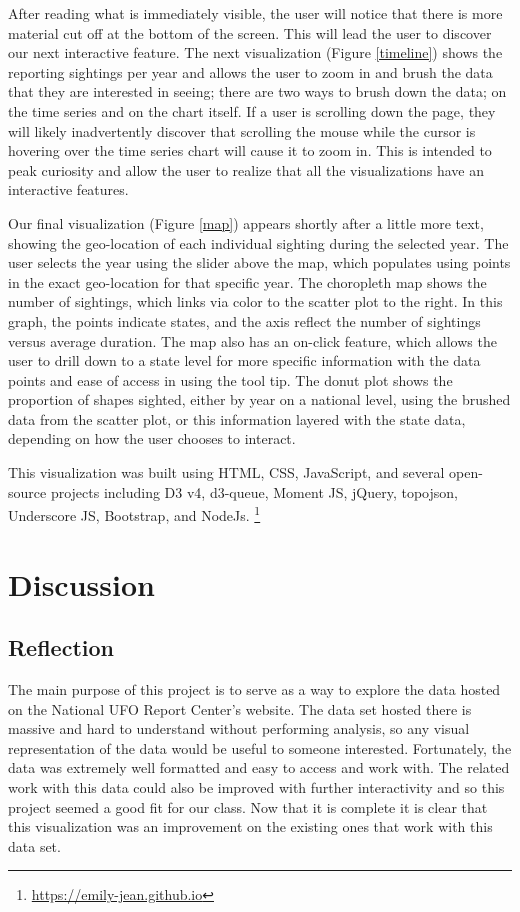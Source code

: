 \documentclass[journal]{vgtc}                %
\begin{document}
After reading what is immediately visible, the user will notice that there is more material cut off at the bottom of the screen. This will lead the user to discover our next interactive feature. The next visualization (Figure \ref{timeline}) shows the reporting sightings per year and allows the user to zoom in and brush the data that they are interested in seeing; there are two ways to brush down the data; on the time series and on the chart itself. If a user is scrolling down the page, they will likely inadvertently discover that scrolling the mouse while the cursor is hovering over the time series chart will cause it to zoom in. This is intended to peak curiosity and allow the user to realize that all the visualizations have an interactive features.

Our final visualization (Figure \ref{map}) appears shortly after a little more text, showing the geo-location of each individual sighting during the selected year. The user selects the year using the slider above the map, which populates using points in the exact geo-location for that specific year. The choropleth map shows the number of sightings, which links via color to the scatter plot to the right. In this graph, the points indicate states, and the axis reflect the number of sightings versus average duration. The map also has an on-click feature, which allows the user to drill down to a state level for more specific information with the data points and ease of access in using the tool tip. The donut plot shows the proportion of shapes sighted, either by year on a national level, using the brushed data from the scatter plot, or this information layered with the state data, depending on how the user chooses to interact. 

This visualization was built using HTML, CSS, JavaScript, and several open-source projects including D3 v4, d3-queue, Moment JS, jQuery, topojson, Underscore JS, Bootstrap, and NodeJs. \footnote{\url{https://emily-jean.github.io}}

\section{Discussion}
\subsection{Reflection}
The main purpose of this project is to serve as a way to explore the data hosted on the National UFO Report Center's website. The data set hosted there is massive and hard to understand without performing analysis, so any visual representation of the data would be useful to someone interested. Fortunately, the data was extremely well formatted and easy to access and work with. The related work with this data could also be improved with further interactivity and so this project seemed a good fit for our class. Now that it is complete it is clear that this visualization was an improvement on the existing ones that work with this data set. 
\end{document}
